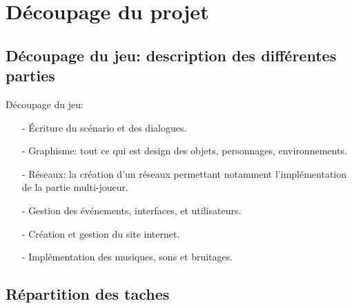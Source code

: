 \documentclass[12pt,a4paper]{article}
\begin{document}
\newpage
\section{Découpage du projet}
\subsection{Découpage du jeu: description des différentes \newline parties}
Découpage du jeu:
\begin{itemize}
\item[-] Écriture du scénario et des dialogues.
\item[-] Graphisme: tout ce qui est design des objets, personnages, environnements.
\item[-] Réseaux: la création d'un réseaux permettant notamment l'implémentation de la partie multi-joueur.
\item[-] Gestion des événements, interfaces, et utilisateurs.
\item[-] Création et gestion du site internet.
\item[-] Implémentation des musiques, sons et bruitages.
\end{itemize}
\subsection{Répartition des taches}
\end{document}
